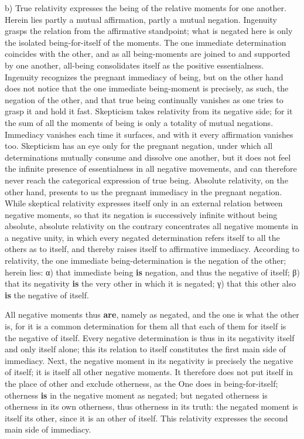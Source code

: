 \documentclass[12pt,a4paper,openany]{book}
\newcommand{\opage}[1]{\marginnote{\footnotesize\textit{[#1]}}}
\begin{document}
b) True relativity expresses the being of the relative moments for one another. Herein lies partly a mutual affirmation, partly a mutual negation.
\setcounter{footnote}{0}%
\opage{90}Ingenuity grasps the relation from the affirmative standpoint; what is negated here is only the isolated being-for-itself of the moments. The one immediate determination coincides with the other, and as all being-moments are joined to and supported by one another, all-being consolidates itself as the positive essentialness. Ingenuity recognizes the pregnant immediacy of being, but on the other hand does not notice that the one immediate being-moment is precisely, as such, the negation of the other, and that true being continually vanishes as one tries to grasp it and hold it fast.
Skepticism takes relativity from its negative side; for it the sum of all the moments of being is only a totality of mutual negations. Immediacy vanishes each time it surfaces, and with it every affirmation vanishes too. Skepticism has an eye only for the pregnant negation, under which all determinations mutually consume and dissolve one another, but it does not feel the infinite presence of essentialness in all negative movements, and can therefore never reach the categorical expression of true being. %
Absolute relativity, on the other hand, presents to us the pregnant immediacy in the pregnant negation. While skeptical relativity expresses itself only in an external relation between negative moments, so that its negation is successively infinite without being absolute, absolute relativity on the contrary concentrates all negative moments in a negative unity, in which every negated determination refers itself to all the others as to itself, and thereby raises itself to affirmative immediacy. According to relativity, the one immediate
\setcounter{footnote}{0}%
\opage{91}being-determination is the negation of the other; herein lies: α) that immediate being \textbf{is} negation, and thus the negative of itself; β) that its negativity \textbf{is} the very other in which it is negated; γ) that this other also \textbf{is} the negative of itself.

All negative moments thus \textbf{are}, namely as negated, and the one is what the other is, for it is a common determination for them all that each of them for itself is the negative of itself. Every negative determination is thus in its negativity itself and only itself alone; this its relation to itself constitutes the first main side of immediacy. Next, the negative moment in its negativity is precisely the negative of itself; it is itself all other negative moments. It therefore does not put itself in the place of other and exclude otherness, as the One does in being-for-itself; otherness \textbf{is} in the negative moment as negated; but negated otherness is otherness in its own otherness, thus otherness in its truth: the negated moment is itself its other, since it is an other of itself. This relativity expresses the second main side of immediacy.
\end{document}

